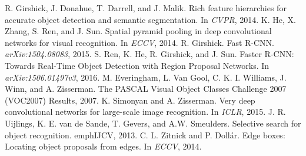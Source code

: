 \documentclass[a4paper]{article}
\begin{document}
\begin{thebibliography}{9}
R. Girshick, J. Donahue, T. Darrell, and J. Malik. Rich feature hierarchies for accurate object detection and semantic segmentation. In \emph{CVPR}, 2014.
K. He, X. Zhang, S. Ren, and J. Sun. Spatial pyramid pooling in deep convolutional networks for visual recognition. In \emph{ECCV}, 2014.
R. Girshick. Fast R-CNN. \emph{arXiv:1504.08083}, 2015.
S. Ren, K. He, R. Girshick, and J. Sun. Faster R-CNN: Towards Real-Time Object Detection with Region Proposal Networks. In \emph{arXiv:1506.01497v3}, 2016.
M. Everingham, L. Van Gool, C. K. I. Williams, J. Winn, and A. Zisserman. The PASCAL Visual Object Classes Challenge 2007 (VOC2007) Results, 2007.
K. Simonyan and A. Zisserman. Very deep convolutional networks for large-scale image recognition. In \emph{ICLR}, 2015.
J. R. Uijlings, K. E. van de Sande, T. Gevers, and A.W. Smeulders. Selective search for object recognition. emph{IJCV}, 2013.
C. L. Zitnick and P. Doll\'ar. Edge boxes: Locating object proposals from edges. In \emph{ECCV}, 2014.

\end{thebibliography}
\end{document}
